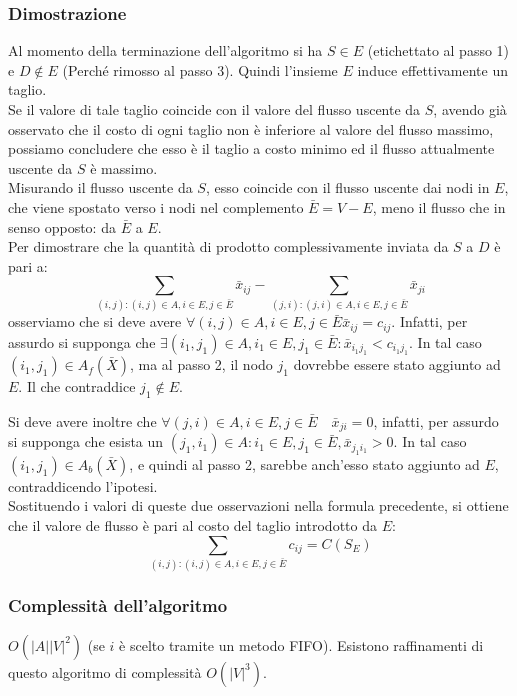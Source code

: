 \documentclass[../template]{subfiles}
\begin{document}
\subsubsection{Dimostrazione}
Al momento della terminazione dell'algoritmo si ha $S \in E$ (etichettato al passo 1) e $D \notin E$ (Perché rimosso al passo 3).
Quindi l'insieme $E$ induce effettivamente un taglio.
\\[10pt]
Se il valore di tale taglio coincide con il valore del flusso uscente da $S$, avendo già osservato che il costo di ogni taglio non è inferiore al
valore del flusso massimo, possiamo concludere che esso è il taglio a costo minimo ed il flusso attualmente uscente da $S$ è massimo.
\\[10pt]
Misurando il flusso uscente da $S$, esso coincide con il flusso uscente dai nodi in $E$, che viene spostato verso i nodi nel complemento $\bar{E} = V - E$,
meno il flusso che in senso opposto: da $\bar{E}$ a $E$.
\\[10pt]
Per dimostrare che la quantità di prodotto complessivamente inviata da $S$ a $D$ è pari a:
\[
    \sum_{(i, j) : (i, j) \in A, i \in E, j \in \bar{E}} \bar{x}_{ij} -
    \sum_{(j, i) : (j, i) \in A, i \in E, j \in \bar{E}} \bar{x}_{ji}
\]
osserviamo che si deve avere $\forall (i, j) \in A, i \in E, j\in \bar{E} \bar{x}_{ij} = c_{ij}$. Infatti, per assurdo si supponga che $\exists (i_1, j_1) \in A, i_1 \in E, j_1 \in \bar{E} : \bar{x}_{i_1 j_1} < c_{i_1 j_1}$.
In tal caso $(i_1, j_1) \in A_f(\bar{X})$, ma al passo 2, il nodo $j_1$
dovrebbe essere stato aggiunto ad $E$. Il che contraddice $j_1 \notin E$.

Si deve avere inoltre che $\forall (j, i) \in A, i \in E, j \in \bar{E} \quad \bar{x}_{ji} = 0$, infatti, per assurdo si supponga che esista un $(j_1, i_1) \in A: i_1 \in E, j_1 \in \bar{E}, \bar{x}_{j_1 i_1} > 0$.
In tal caso $(i_1, j_1) \in A_b(\bar{X})$, e quindi al passo 2, sarebbe anch'esso stato aggiunto ad $E$, contraddicendo l'ipotesi.
\\[10pt]
Sostituendo i valori di queste due osservazioni nella formula precedente,
si ottiene che il valore de flusso è pari al costo del taglio introdotto da $E$:
\[
    \sum_{(i, j) : (i, j) \in A, i \in E, j \in \bar{E}} c_{ij} = C(S_E)
\]
\subsubsection{Complessità dell'algoritmo}
$O(|A||V|^2)$ (se $i$ è scelto tramite un metodo FIFO).
Esistono raffinamenti di questo algoritmo di complessità $O(|V|^3)$.
\end{document}
